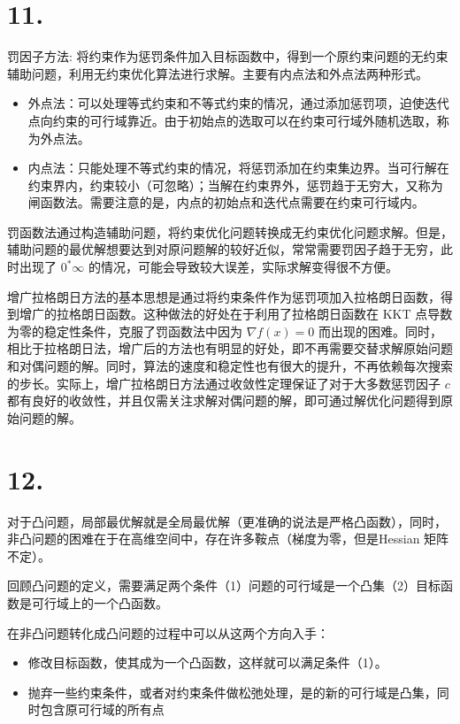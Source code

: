 \documentclass{article}
\begin{document}
	\section*{11.}
	
	罚因子方法: 将约束作为惩罚条件加入目标函数中，得到一个原约束问题的无约束辅助问题，利用无约束优化算法进行求解。主要有内点法和外点法两种形式。

	\begin{itemize}
		\item 外点法：可以处理等式约束和不等式约束的情况，通过添加惩罚项，迫使迭代点向约束的可行域靠近。由于初始点的选取可以在约束可行域外随机选取，称为外点法。
		\item 内点法：只能处理不等式约束的情况，将惩罚添加在约束集边界。当可行解在约束界内，约束较小（可忽略）；当解在约束界外，惩罚趋于无穷大，又称为闸函数法。需要注意的是，内点的初始点和迭代点需要在约束可行域内。
	\end{itemize}

	罚函数法通过构造辅助问题，将约束优化问题转换成无约束优化问题求解。但是，辅助问题的最优解想要达到对原问题解的较好近似，常常需要罚因子趋于无穷，此时出现了 $0^* \infty$ 的情况，可能会导致较大误差，实际求解变得很不方便。

	增广拉格朗日方法的基本思想是通过将约束条件作为惩罚项加入拉格朗日函数，得到增广的拉格朗日函数。这种做法的好处在于利用了拉格朗日函数在 KKT 点导数为零的稳定性条件，克服了罚函数法中因为 $\nabla f(x) = 0$ 而出现的困难。同时，相比于拉格朗日法，增广后的方法也有明显的好处，即不再需要交替求解原始问题和对偶问题的解。同时，算法的速度和稳定性也有很大的提升，不再依赖每次搜索的步长。实际上，增广拉格朗日方法通过收敛性定理保证了对于大多数惩罚因子 $c$ 都有良好的收敛性，并且仅需关注求解对偶问题的解，即可通过解优化问题得到原始问题的解。


	\section*{12.}

	对于凸问题，局部最优解就是全局最优解（更准确的说法是严格凸函数），同时，非凸问题的困难在于在高维空间中，存在许多鞍点（梯度为零，但是Hessian 矩阵不定）。
	
	回顾凸问题的定义，需要满足两个条件（1）问题的可行域是一个凸集（2）目标函数是可行域上的一个凸函数。
	
	在非凸问题转化成凸问题的过程中可以从这两个方向入手：
	\begin{itemize}
	\item 修改目标函数，使其成为一个凸函数，这样就可以满足条件（1）。
	\item 抛弃一些约束条件，或者对约束条件做松弛处理，是的新的可行域是凸集，同时包含原可行域的所有点
	\end{itemize}
\end{document}
